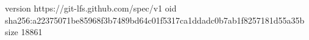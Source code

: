 version https://git-lfs.github.com/spec/v1
oid sha256:a22375071be85968f3b7489bd64c01f5317ca1ddadc0b7ab1f8257181d55a35b
size 18861
